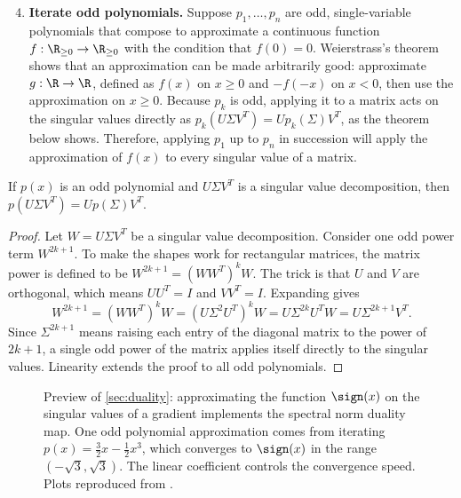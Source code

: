 \begin{enumerate}
    \setcounter{enumi}{3}
    \item \textbf{Iterate odd polynomials.} Suppose $p_1, \dots, p_n$ are odd, single-variable polynomials that compose to approximate a continuous function $f : \R_{\geq0} \to \R_{\geq0}$ with the condition that $f(0) = 0$. Weierstrass's theorem shows that an approximation can be made arbitrarily good: approximate $g : \R \to \R$, defined as $f(x)$ on $x \geq 0$ and $-f(-x)$ on $x < 0$, then use the approximation on $x \geq 0$. Because $p_k$ is odd, applying it to a matrix acts on the singular values directly as $p_k(U \Sigma V^T) = U p_k(\Sigma) V^T$, as the theorem below shows. Therefore, applying $p_1$ up to $p_n$ in succession will apply the approximation of $f(x)$ to every singular value of a matrix.
\end{enumerate}

\begin{theorembox}
    If $p(x)$ is an odd polynomial and $U \Sigma V^T$ is a singular value decomposition, then $p(U \Sigma V^T) = U p(\Sigma) V^T$.
\end{theorembox}

\begin{proof}
    Let $W = U \Sigma V^T$ be a singular value decomposition. Consider one odd power term $W^{2k + 1}$. To make the shapes work for rectangular matrices, the matrix power is defined to be $W^{2k + 1} = (WW^T)^k W$. The trick is that $U$ and $V$ are orthogonal, which means $UU^T = I$ and $VV^T = I$. Expanding gives \begin{equation}
        W^{2k+1} =  (WW^T)^k W = (U \Sigma^2 U^T)^k W = U \Sigma^{2k} U^T W = U \Sigma^{2k+1} V^T.
    \end{equation} Since $\Sigma^{2k+1}$ means raising each entry of the diagonal matrix to the power of $2k+1$, a single odd power of the matrix applies itself directly to the singular values. Linearity extends the proof to all odd polynomials.
\end{proof}

\begin{figure}[t]
    \centering
    \subfloat{
        
    }
    \hspace{0.03\textwidth}
    \subfloat{
        
    }
    \caption{Preview of \cref{sec:duality}: approximating the function $\sign(x)$ on the singular values of a gradient implements the spectral norm duality map. One odd polynomial approximation comes from iterating $p(x) = \tfrac32 x - \tfrac12 x^3$, which converges to $\sign(x)$ in the range $(-\sqrt{3}, \sqrt{3})$. The linear coefficient controls the convergence speed. Plots reproduced from \citet{modula-docs}.}  %
    \label{fig:newton-schulz-simple}
\end{figure}


